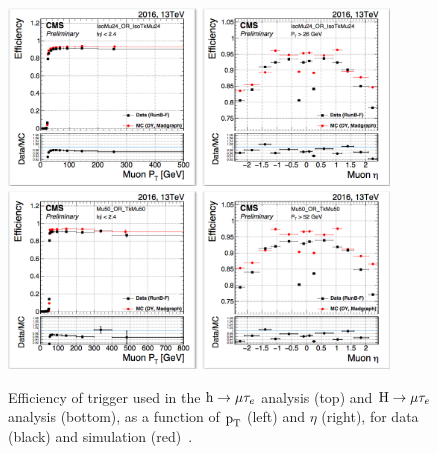 \begin{figure}[!htpb]\centering
 \captionsetup{width=0.9\textwidth,justification=centering}
 \includegraphics[width=0.9\textwidth,trim=0 -15pt 0 0,clip]{plots_and_figures/chapter3/muontrig1.png}\\
 \includegraphics[width=0.9\textwidth]{plots_and_figures/chapter3/muontrig2.png} 
\caption{Efficiency of trigger used in the $\text{h} \to \mu \tau_{e}$ analysis (top) and $\text{H} \to \mu \tau_{e}$ analysis (bottom), as a function of $\text{p}_\text{T}$ (left) and $\eta$ (right), for data (black) and simulation (red)~\cite{muon_pog}.}
 \label{fig:muon_trigger}
\end{figure}